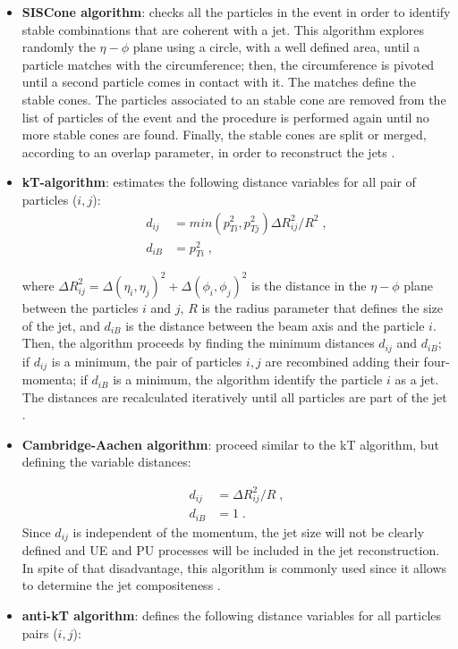 \begin{itemize}
 \item \textbf{SISCone algorithm}: checks all the particles in the event in order to 
 identify stable combinations that are coherent with a jet. This algorithm explores randomly the $\eta-\phi$ plane
 using a circle, with a well defined area, until a particle matches with the circumference; then, the circumference
 is pivoted until a second particle comes in contact with it. The matches define the stable cones. The particles
 associated to an stable cone are removed from the list of particles of the event and the procedure is performed again 
 until no more stable cones are found. Finally, the stable cones are split or merged, according to an overlap parameter, in order to 
 reconstruct the jets \cite{ICRJet}. 
 \vspace{0.3cm}
 
 \item \textbf{kT-algorithm}: estimates the following distance variables for all pair of particles ($i,j$):
\begin{equation} \label{eq:kt}  
 \begin{aligned}
  d_{ij} &= min(p_{Ti}^{2},p_{Tj}^{2})\Delta R_{ij}^{2}/R^{2} \;,\\
  d_{iB} &= p_{Ti}^{2} \;,
  \end{aligned}
  \end{equation}

\noindent where $\Delta R_{ij}^{2}=\Delta(\eta_{i},\eta_{j})^{2}+\Delta(\phi_{i},\phi_{j})^{2}$ is the distance 
in the $\eta-\phi$ plane between the particles $i$ and $j$, $R$ is the radius parameter that 
defines the size of the jet, and $d_{iB}$ is the distance between the beam axis and the particle $i$. Then, the algorithm
proceeds by finding the minimum distances $d_{ij}$ and $d_{iB}$; if $d_{ij}$ is a minimum, the pair 
of particles $i,j$ are recombined adding their four-momenta; if $d_{iB}$ is a minimum, the algorithm
identify the particle $i$ as a jet. The distances are recalculated iteratively until all particles are  %
part of the jet \cite{ktalgorithm, ICRJet}. 
 \vspace{0.3cm}
\item \textbf{Cambridge-Aachen algorithm}: proceed similar to the kT algorithm, but defining 
 the variable distances:

 \begin{equation}   \label{eq:Cambridge-Aachen}
 \begin{aligned}
  d_{ij} &= \Delta R_{ij}^{2}/R \;,\\
  d_{iB} &= 1 \;.
  \end{aligned}
  \end{equation}
\noindent Since $d_{ij}$ is independent of the momentum, the jet size will not 
be clearly defined and UE and PU processes will be included in the jet reconstruction. In spite of 
that disadvantage, this algorithm is commonly used since it allows to determine the 
jet compositeness \cite{Cambrigdealgorithm}.
 \vspace{0.3cm}
 \item \textbf{anti-kT algorithm}: defines the following distance variables for all particles pairs ($i,j$):


\end{itemize}
